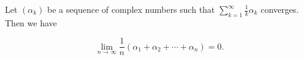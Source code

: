 Let $(\alpha_k)$ be a sequence of complex numbers such that $\sum_{k=1}^{\infty} \frac{1}{k} \alpha_k$ converges. Then we have

$$\lim_{n \to \infty} \frac{1}{n} (\alpha_1 + \alpha_2 + \cdots + \alpha_n) = 0.$$